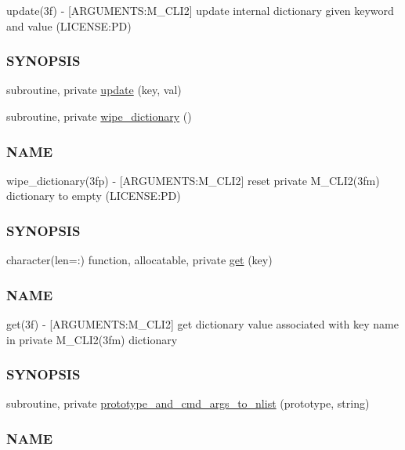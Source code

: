 \begin{DoxyCompactItemize}
\begin{DoxyCompactList}
update(3f) -\/ \mbox{[}A\+R\+G\+U\+M\+E\+N\+TS\+:M\+\_\+\+C\+L\+I2\mbox{]} update internal dictionary given keyword and value (L\+I\+C\+E\+N\+SE\+:PD) \subsubsection*{S\+Y\+N\+O\+P\+S\+IS}\end{DoxyCompactList}\item 
subroutine, private \mbox{\hyperlink{namespacem__cli2_a160d56bc4a10faef7e8a8a4f04f4dadb}{update}} (key, val)
\item 
subroutine, private \mbox{\hyperlink{namespacem__cli2_ab1525b0419475486f520ef502daa5e94}{wipe\+\_\+dictionary}} ()
\begin{DoxyCompactList}\small\item\em \subsubsection*{N\+A\+ME}

wipe\+\_\+dictionary(3fp) -\/ \mbox{[}A\+R\+G\+U\+M\+E\+N\+TS\+:M\+\_\+\+C\+L\+I2\mbox{]} reset private M\+\_\+\+C\+L\+I2(3fm) dictionary to empty (L\+I\+C\+E\+N\+SE\+:PD) \subsubsection*{S\+Y\+N\+O\+P\+S\+IS}\end{DoxyCompactList}\item 
character(len=\+:) function, allocatable, private \mbox{\hyperlink{namespacem__cli2_aa92e8ad0300d4e324e29eae1ab9d04b4}{get}} (key)
\begin{DoxyCompactList}\small\item\em \subsubsection*{N\+A\+ME}

get(3f) -\/ \mbox{[}A\+R\+G\+U\+M\+E\+N\+TS\+:M\+\_\+\+C\+L\+I2\mbox{]} get dictionary value associated with key name in private M\+\_\+\+C\+L\+I2(3fm) dictionary \subsubsection*{S\+Y\+N\+O\+P\+S\+IS}\end{DoxyCompactList}\item 
subroutine, private \mbox{\hyperlink{namespacem__cli2_a06f8bb6dd63fd7ac2a91b46ee89baaa9}{prototype\+\_\+and\+\_\+cmd\+\_\+args\+\_\+to\+\_\+nlist}} (prototype, string)
\begin{DoxyCompactList}\small\item\em \subsubsection*{N\+A\+ME}


\end{DoxyCompactList}
\end{DoxyCompactItemize}
